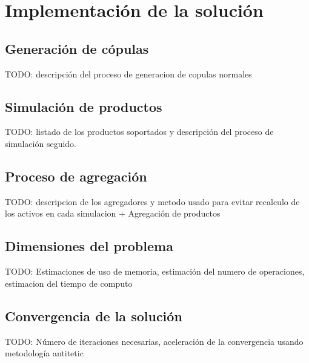 
%
%
%
%
%
%
%
%

\chapter{Implementaci\'on de la soluci\'on}
\label{sec:implementation}

\section{Generaci\'on de c\'opulas}

TODO: descripci\'on del proceso de generacion de copulas normales

\section{Simulaci\'on de productos}

TODO: listado de los productos soportados y descripci\'on del proceso de 
simulaci\'on seguido.


\section{Proceso de agregaci\'on}

TODO: descripcion de los agregadores y metodo usado para evitar recalculo 
de los activos en cada simulacion + Agregaci\'on de productos


\section{Dimensiones del problema}

TODO: Estimaciones de uso de memoria, estimaci\'on del numero de operaciones,
estimacion del tiempo de computo


\section{Convergencia de la soluci\'on}

TODO: N\'úmero de iteraciones necesarias, aceleraci\'on de la convergencia
usando metodología antitetic


